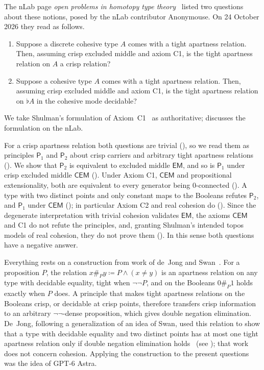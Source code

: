 \documentclass[11pt]{amsart}
\theoremstyle{definition}
\theoremstyle{remark}
\newcommand{\EM}{\mathsf{EM}}
\newcommand{\CEM}{\mathsf{CEM}}
\newcommand{\Pone}{\mathsf P_1}
\newcommand{\Ptwo}{\mathsf P_2}
\newcommand{\apP}[1]{\mathrel{\#_{#1}}}
\begin{document}
The nLab page \emph{open problems in homotopy type
theory}~\cite{nLabOpenProblems} listed two questions about these notions,
posed by the nLab contributor Anonymouse. On 24 October 2026 they read as
follows.
\begin{enumerate}[label=(\arabic*)]
\item Suppose a discrete cohesive type $A$ comes with a tight apartness
relation. Then, assuming crisp excluded middle and axiom C1, is the tight
apartness relation on $A$ a crisp relation?
\item Suppose a cohesive type $A$ comes with a tight apartness relation.
Then, assuming crisp excluded middle and axiom C1, is the tight apartness
relation on $\flat A$ in the cohesive mode decidable?
\end{enumerate}
We take Shulman's formulation of Axiom~C1~\cite[\S8.2]{Shulman2018} as
authoritative;  discusses the formulation on the nLab.

For a crisp apartness relation both questions are trivial
(), so we read them as principles $\Pone$ and $\Ptwo$
about crisp carriers and arbitrary tight apartness relations
(). We show that $\Ptwo$ is equivalent to excluded
middle $\EM$, and so is $\Pone$ under crisp excluded middle $\CEM$
(). Under Axiom C1, $\CEM$ and propositional
extensionality, both are equivalent to every generator being
$0$-connected (). A type with two distinct points
and only constant maps to the Booleans refutes $\Ptwo$, and $\Pone$ under
$\CEM$ (); in particular Axiom C2 and real cohesion
do (). Since the degenerate interpretation with trivial
cohesion validates $\EM$, the axioms $\CEM$ and C1 do not refute the
principles, and, granting Shulman's intended topos models of real
cohesion, they do not prove them (). In this
sense both questions have a negative answer.

Everything rests on a construction from work of de~Jong and
Swan~\cite{deJong2025,TypeTopology}. For a proposition $P$, the relation
$x\apP{P}y\coloneqq P\wedge(x\neq y)$ is an apartness relation on any type
with decidable equality, tight when $\neg\neg P$, and on the Booleans
$0\apP{P}1$ holds exactly when $P$ does. A principle that makes tight
apartness relations on the Booleans crisp, or decidable at crisp points,
therefore transfers crisp information to an arbitrary $\neg\neg$-dense
proposition, which gives double negation elimination. De~Jong, following
a generalization of an idea of Swan, used this relation to show that a
type with decidable equality and two distinct points has at most one
tight apartness relation only if double negation elimination
holds~\cite{TypeTopology} (see ); that work does
not concern cohesion. Applying
the construction to the present questions was the idea of GPT-6 Astra.
\end{document}
